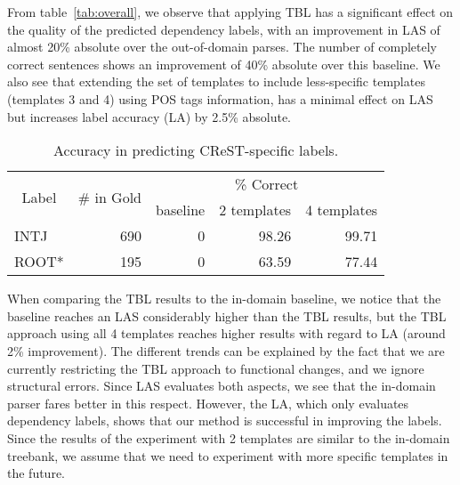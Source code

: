 From table~\ref{tab:overall}, we observe that applying TBL has a significant effect on the quality of the predicted dependency labels, with an improvement in LAS of almost 20\% absolute over the out-of-domain parses. The number of completely correct sentences shows an improvement of 40\% absolute over this baseline. We also see that extending the set of templates to include less-specific templates (templates 3 and 4) using POS tags information, has a minimal effect on LAS but increases label accuracy (LA) by 2.5\% absolute. 

\begin{table}[t]
\centering
\begin{tabular}{l|r|rrr|}
\multicolumn{1}{c|}{\multirow{2}{*}{Label}} & \multirow{2}{*}{\# in Gold} & \multicolumn{3}{c|}{\% Correct} \\ \cline{3-5}
\multicolumn{1}{c|}{} &  & baseline &2 templates & 4 templates \\ \hline
INTJ & 690 & 0 & 98.26 & 99.71 \\
ROOT* & 195 & 0 & 63.59 & 77.44 \\ \hline
\end{tabular}
\caption{Accuracy in predicting CReST-specific labels.}
\label{tab:labelcomp}
\end{table}




When comparing the TBL results  to the in-domain baseline, we notice that the baseline reaches an LAS considerably higher than the TBL results, but the TBL approach using all 4 templates reaches higher results with regard to LA (around 2\% improvement). The different trends can be explained by the fact that we are currently restricting the TBL approach to functional changes, and we ignore structural errors. Since LAS evaluates both aspects, we see that the in-domain parser fares better in this respect. However, the LA, which only evaluates dependency labels, shows that our method is successful in improving the labels. Since the results of the experiment with 2 templates are similar to the in-domain treebank, we assume that we need to experiment with more specific templates in the future.


